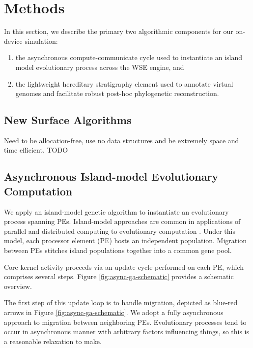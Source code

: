 \section{Methods} \label{sec:methods}

In this section, we describe the primary two algorithmic components for our on-device simulation:
\begin{enumerate}
\item the asynchronous compute-communicate cycle used to instantiate an island model evolutionary process across the WSE engine, and
\item the lightweight hereditary stratigraphy element used to annotate virtual genomes and facilitate robust post-hoc phylogenetic reconstruction.
\end{enumerate}




\subsection{New Surface Algorithms}

Need to be allocation-free, use no data structures and be extremely space and time efficient.
TODO





\subsection{Asynchronous Island-model Evolutionary Computation}

We apply an island-model genetic algorithm to instantiate an evolutionary process spanning PEs.
Island-model approaches are common in applications of parallel and distributed computing to evolutionary computation \citep{bennett1999building}.
Under this model, each processor element (PE) hosts an independent population.
Migration between PEs stitches island populations together into a common gene pool.

Core kernel activity proceeds via an update cycle performed on each PE, which comprises several steps.
Figure \ref{fig:async-ga-schematic} provides a schematic overview.

The first step of this update loop is to handle migration, depicted as blue-red arrows in Figure \ref{fig:async-ga-schematic}.
We adopt a fully asynchronous approach to migration between neighboring PEs.
Evolutionary processes tend to occur in asynchronous manner with arbitrary factors influencing things, so this is a reasonable relaxation to make.

